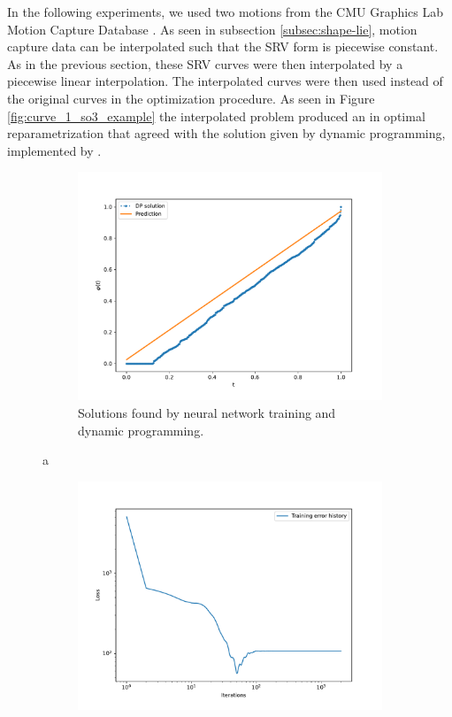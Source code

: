 In the following experiments, we used two motions from the CMU Graphics Lab Motion Capture Database \cite{mocap}. As seen in subsection \ref{subsec:shape-lie}, motion capture data can be interpolated such that the SRV form is piecewise constant. As in the previous section, these SRV curves were then interpolated by a piecewise linear interpolation. The interpolated curves were then used instead of the original curves in the optimization procedure. As seen in Figure \ref{fig:curve_1_so3_example} the interpolated problem produced an in optimal reparametrization that agreed with the solution given by dynamic programming, implemented by \citeauthor{lystad2019}\cite{lystad2019}. 

\begin{figure}[t]
    \begin{subfigure}[t]{0.5\textwidth}
        \centering
        \includegraphics[width=\linewidth]{figures/curve_so3/pc_eks_2/plot_1_0.pdf}
        \caption{Solutions found by neural network training and dynamic programming.}\label{fig:curve_so3_pc_solution}
    \end{subfigure}a
    \begin{subfigure}[t]{0.5\textwidth}
        \centering
        \includegraphics[width=\linewidth]{figures/curve_so3/pc_eks_2/history_plot_1.pdf}

\end{subfigure}
\end{figure}
